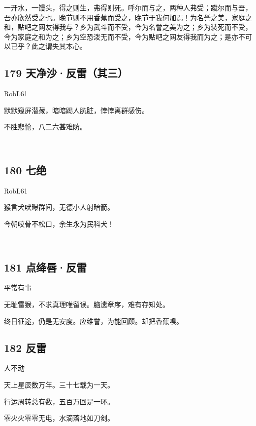 一开水，一馒头，得之则生，弗得则死。呼尔而与之，两种人弗受；蹴尔而与吾，吾亦欣然受之也。晚节则不用香蕉而受之，晚节于我何加焉！为名誉之美，家庭之和，贴吧之网友得我与？乡为武斗而不受，今为名誉之美为之；乡为装死而不受，今为家庭之和为之；乡为空恐泼无而不受，今为贴吧之网友得我而为之；是亦不可以已乎？此之谓失其本心。

\hypertarget{ux5929ux51c0ux6c99ux53cdux96f7ux5176ux4e09}{%
\subsection{179
天净沙·反雷（其三）}\label{ux5929ux51c0ux6c99ux53cdux96f7ux5176ux4e09}}

RobL61

默默窥屏潜藏，暗暗踢人肮脏，悻悻离群感伤。

不胜悲怆，八二六甚难防。

~\\

\hypertarget{ux4e03ux7edd}{%
\subsection{180 七绝}\label{ux4e03ux7edd}}

RobL61

猴言犬吠曝群间，无德小人射暗箭。

今朝咬骨不松口，余生永为民科犬！

~\\

\hypertarget{ux70b9ux7edbux5507ux53cdux96f7}{%
\subsection{181 点绛唇·反雷}\label{ux70b9ux7edbux5507ux53cdux96f7}}

平常有事

无耻雷猴，不求真理唯留误。脑遗章序，难有存知处。

终日征途，仍是无安度。应维誉，为能回顾。却把香蕉嗅。

\hypertarget{ux53cdux96f7-2}{%
\subsection{182 反雷}\label{ux53cdux96f7-2}}

人不动

天上星辰数万年。三十七载为一天。

行运周转总有数，五百万回是一环。

零火火零零无电，水滴落地如刀剑。

